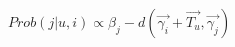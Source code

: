\documentclass[preview,convert={outext=.png,density=1600}]{standalone}
\begin{document}
$\mathit{Prob}(j | u, i) \propto \beta_j - d(\vec{\gamma_i} + \vec{T_u}, \vec{\gamma_j})$
\end{document}
